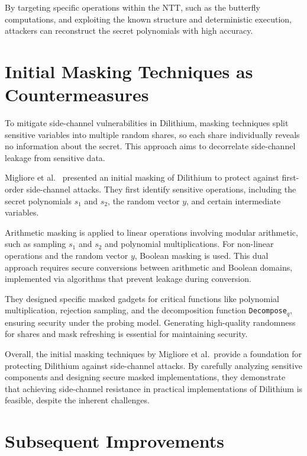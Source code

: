 By targeting specific operations within the \ac{NTT}, such as the butterfly computations, and exploiting the known structure and deterministic execution, attackers can reconstruct the secret polynomials with high accuracy.

\section{Initial Masking Techniques as Countermeasures}

To mitigate side-channel vulnerabilities in Dilithium, masking techniques split sensitive variables into multiple random shares, so each share individually reveals no information about the secret. This approach aims to decorrelate side-channel leakage from sensitive data.

Migliore et al.~\cite{Migliore19} presented an initial masking of Dilithium to protect against first-order side-channel attacks. They first identify sensitive operations, including the secret polynomials $s_1$ and $s_2$, the random vector $y$, and certain intermediate variables.

Arithmetic masking is applied to linear operations involving modular arithmetic, such as sampling $s_1$ and $s_2$ and polynomial multiplications. For non-linear operations and the random vector $y$, Boolean masking is used. This dual approach requires secure conversions between arithmetic and Boolean domains, implemented via algorithms that prevent leakage during conversion.

They designed specific masked gadgets for critical functions like polynomial multiplication, rejection sampling, and the decomposition function \texttt{Decompose$_q$}, ensuring security under the probing model. Generating high-quality randomness for shares and mask refreshing is essential for maintaining security.

Overall, the initial masking techniques by Migliore et al.\ provide a foundation for protecting Dilithium against side-channel attacks. By carefully analyzing sensitive components and designing secure masked implementations, they demonstrate that achieving side-channel resistance in practical implementations of Dilithium is feasible, despite the inherent challenges.



\section{Subsequent Improvements}

